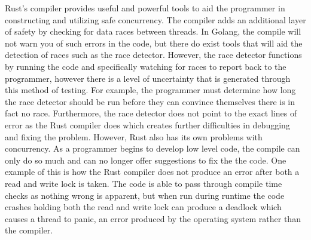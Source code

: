 Rust’s compiler provides useful and powerful tools to aid the programmer in constructing and utilizing safe concurrency. The compiler adds an additional layer of safety by checking for data races between threads. In Golang, the compile will not warn you of such errors in the code, but there do exist tools that will aid the detection of races such as the race detector. However, the race detector functions by running the code and specifically watching for races to report back to the programmer, however there is a level of uncertainty that is generated through this method of testing. For example, the programmer must determine how long the race detector should be run before they can convince themselves there is in fact no race. Furthermore, the race detector does not point to the exact lines of error as the Rust compiler does which creates further difficulties in debugging and fixing the problem. However, Rust also has its own problems with concurrency. As a programmer begins to develop low level code, the compile can only do so much and can no longer offer suggestions to fix the the code. One example of this is how the Rust compiler does not produce an error after both a read and write lock is taken. The code is able to pass through compile time checks as nothing wrong is apparent, but when run during runtime the code crashes holding both the read and write lock can produce a deadlock which causes a thread to panic, an error produced by the operating system rather than the compiler.
